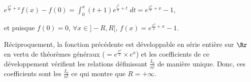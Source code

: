 {{\begin{center}
$e^{\frac{x^2}{2}+x}f(x)-f(0)=\int_{0}^{x}(t+1)e^{\frac{t^2}{2}+t}\;dt=e^{\frac{x^2}{2}+x}-1$,
\end{center}

et puisque $f(0)=0$, $\forall x\in]-R,R[$, $f(x)=e^{\frac{x^2}{2}+x}-1$.

Réciproquement, la fonction précédente est développable en série entière sur $\Rr$ en vertu de théorèmes généraux ($=e^{\frac{x^2}{2}}\times e^x$) et les coefficients de ce développement vérifient les relations définissant $\frac{I_n}{n!}$ de manière unique. Donc, ces coefficients sont les $\frac{I_n}{n!}$ ce qui montre que $R = +\infty$.

\begin{center}
\end{center}
}
}

